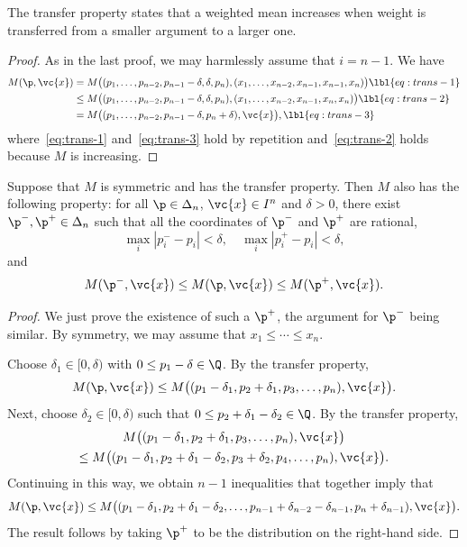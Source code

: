 The transfer property states that a weighted mean increases when
weight is transferred from a smaller argument to a larger one.

\begin{proof}
As in the last proof, we may harmlessly assume that $i = n - 1$.  We have
% 
\begin{align}
M(\p, \vc{x})   &
=
M\bigl(
(p_1, \ldots, p_{n - 2}, p_{n - 1} - \delta, \delta, p_n),
(x_1, \ldots, x_{n - 2}, x_{n - 1}, x_{n - 1}, x_n)
\bigr)  
\lbl{eq:trans-1}      \\
&
\leq
M\bigl(
(p_1, \ldots, p_{n - 2}, p_{n - 1} - \delta, \delta, p_n),
(x_1, \ldots, x_{n - 2}, x_{n - 1}, x_n, x_n)
\bigr)  
\lbl{eq:trans-2}      \\
&
=
M\bigl(
(p_1, \ldots, p_{n - 2}, p_{n - 1} - \delta, p_n + \delta),
\vc{x}
\bigr),
\lbl{eq:trans-3}
\end{align}
% 
where~\eqref{eq:trans-1} and~\eqref{eq:trans-3} hold by repetition
and~\eqref{eq:trans-2} holds because $M$ is increasing.
\end{proof}

\begin{lemma}
Suppose that $M$ is symmetric and has the transfer property.  Then $M$ also
has the following %
%
% 
property: for all $\p \in \Delta_n$, $\vc{x} \in I^n$ and $\delta > 0$,
there exist $\p^-, \p^+ \in \Delta_n$ such that all the coordinates of
$\p^-$ and $\p^+$ are rational,
\[
\max_i |p^-_i - p_i| < \delta,
\quad
\max_i |p^+_i - p_i| < \delta,
\]
and
\[
M(\p^-, \vc{x}) \leq M(\p, \vc{x}) \leq M(\p^+, \vc{x}).
\]
\end{lemma}

\begin{proof}
We just prove the existence of such a $\p^+$, the argument for $\p^-$ being
similar.  By symmetry, we may assume that $x_1 \leq \cdots \leq x_n$.

Choose $\delta_1 \in [0, \delta)$ with $0 \leq p_1 - \delta \in \Q$.  By
  the transfer property,
\[
M(\p, \vc{x})
\leq
M\bigl(
(p_1 - \delta_1, p_2 + \delta_1, p_3, \ldots, p_n), 
\vc{x}
\bigr).
\]
Next, choose $\delta_2 \in [0, \delta)$ such that $0 \leq p_2 + \delta_1 -
  \delta_2 \in \Q$.  By the transfer property,
% 
\begin{multline*}
M\bigl(
(p_1 - \delta_1, p_2 + \delta_1, p_3, \ldots, p_n), 
\vc{x}
\bigr)
\\
\leq
M\bigl(
(p_1 - \delta_1, p_2 + \delta_1 - \delta_2, p_3 + \delta_2, p_4, 
\ldots, p_n), 
\vc{x}
\bigr).
\end{multline*}
% 
Continuing in this way, we obtain $n - 1$ inequalities that together imply
that 
\[
M(\p, \vc{x})
\leq
M\bigl(
(p_1 - \delta_1, 
p_2 + \delta_1 - \delta_2, \ldots, 
p_{n - 1} + \delta_{n - 2} - \delta_{n - 1}, 
p_n + \delta_{n - 1}),
\vc{x}
\bigr).
\]
The result follows by taking $\p^+$ to be the distribution on the
right-hand side. 
\end{proof}

